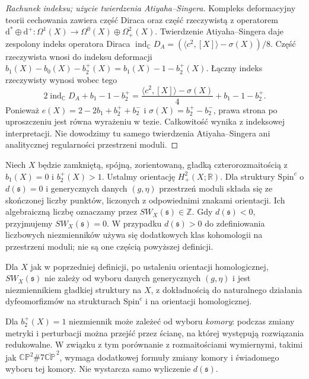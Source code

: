 \begin{proof}[Rachunek indeksu; użycie twierdzenia Atiyaha--Singera]
Kompleks deformacyjny teorii cechowania zawiera część
Diraca oraz część rzeczywistą z operatorem
$\mathrm d^*\oplus\mathrm d^+:\Omega^1(X)\to
\Omega^0(X)\oplus\Omega^2_+(X)$.
Twierdzenie Atiyaha--Singera daje zespolony indeks operatora
Diraca $\operatorname{ind}_{\mathbb C}D_A
=(\langle c^2,[X]\rangle-\sigma(X))/8$.
Część rzeczywista wnosi do indeksu deformacji
$b_1(X)-b_0(X)-b_2^+(X)=b_1(X)-1-b_2^+(X)$.
Łączny indeks rzeczywisty wynosi wobec tego
\[
2\operatorname{ind}_{\mathbb C}D_A+b_1-1-b_2^+
=\frac{\langle c^2,[X]\rangle-\sigma(X)}4+b_1-1-b_2^+.
\]
Ponieważ $e(X)=2-2b_1+b_2^++b_2^-$ i
$\sigma(X)=b_2^+-b_2^-$, prawa strona po uproszczeniu
jest równa wyrażeniu w tezie.
Całkowitość wynika z indeksowej interpretacji.
Nie dowodzimy tu samego twierdzenia Atiyaha--Singera ani
analitycznej regularności przestrzeni moduli.
\end{proof}

\begin{definicja}
Niech $X$ będzie zamkniętą, spójną, zorientowaną,
gładką czterorozmaitością z $b_1(X)=0$ i $b_2^+(X)>1$.
Ustalmy orientację $H^2_+(X;\mathbb R)$.
Dla struktury $\mathrm{Spin}^c$ o $d(\mathfrak s)=0$
i generycznych danych $(g,\eta)$ przestrzeń moduli
składa się ze skończonej liczby punktów, liczonych
z odpowiednimi znakami orientacji. Ich algebraiczną
liczbę oznaczamy przez $SW_X(\mathfrak s)\in\mathbb Z$.
Gdy $d(\mathfrak s)<0$, przyjmujemy $SW_X(\mathfrak s)=0$.
W przypadku $d(\mathfrak s)>0$ do zdefiniowania
liczbowych niezmienników używa się dodatkowych klas
kohomologii na przestrzeni moduli; nie są one częścią
powyższej definicji.
\end{definicja}

\begin{twierdzenie}
Dla $X$ jak w poprzedniej definicji, po ustaleniu
orientacji homologicznej, $SW_X(\mathfrak s)$ nie zależy
od wyboru danych generycznych $(g,\eta)$ i jest
niezmiennikiem gładkiej struktury na $X$, z dokładnością
do naturalnego działania dyfeomorfizmów na strukturach
$\mathrm{Spin}^c$ i na orientacji homologicznej.
\end{twierdzenie}

\begin{uwaga}[Przypadek $b_2^+=1$]
Dla $b_2^+(X)=1$ niezmiennik może zależeć od wyboru
\emph{komory}: podczas zmiany metryki i perturbacji
można przejść przez ścianę, na której występują
rozwiązania redukowalne. W związku z tym porównanie
z rozmaitościami wymiernymi, takimi jak
$\mathbb{CP}^2\#7\overline{\mathbb{CP}}^{\,2}$,
wymaga dodatkowej formuły zmiany komory i świadomego
wyboru tej komory. Nie wystarcza samo wyliczenie
$d(\mathfrak s)$.
\end{uwaga}

